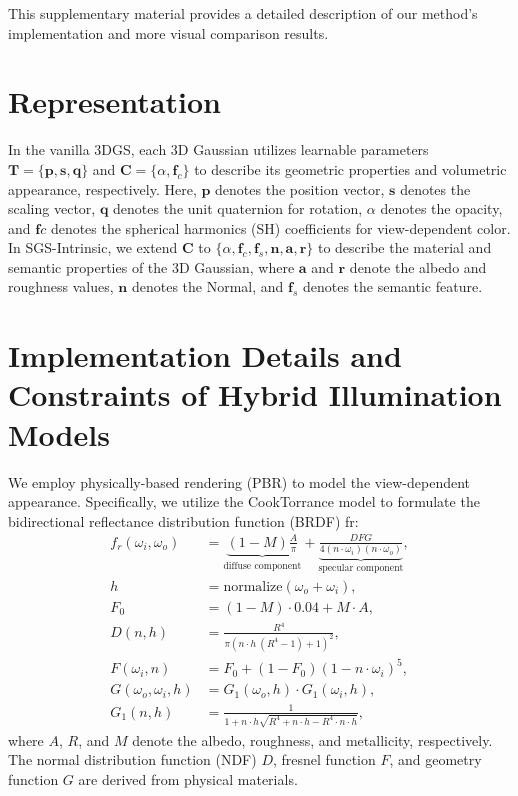 \setcounter{section}{0}

\maketitlesupplementary
This supplementary material provides a detailed description of our method's implementation and more 
visual comparison results.

\section{Representation}
In the vanilla 3DGS, each 3D Gaussian utilizes learnable parameters $\bm{T} = \{\bm{p}, \bm{s}, \bm{q} \}$ and $\bm{C} = \{\alpha, \bm{f}_{c}\}$ to describe its geometric properties and volumetric appearance, respectively.
Here, $\bm{p}$ denotes the position vector, $\bm{s}$ denotes the scaling vector, $\bm{q}$ denotes the unit quaternion for rotation, $\alpha$ denotes the opacity, and $\bm{f}{c}$ denotes the spherical harmonics (SH) coefficients for view-dependent color.
In SGS-Intrinsic, we extend $\bm{C}$ to $\{\alpha, \bm{f}_{c}, \bm{f}_{s}, \bm{n}, \bm{a}, \bm{r}\}$ to describe the material and semantic properties of the 3D Gaussian, where $\bm{a}$ and $\bm{r}$ denote the albedo and roughness values, $\bm{n}$ denotes the Normal, and $\bm{f}_{s}$ denotes the semantic feature.



\section{Implementation Details and Constraints of Hybrid Illumination Models}
We employ physically-based rendering (PBR) to model the view-dependent appearance. Specifically, we utilize the CookTorrance model to formulate the bidirectional reflectance distribution function (BRDF) fr:
\begin{equation}
\label{eq:brdf:supp}
\begin{aligned}
f_r(\omega_i, \omega_o) &= 
\underbrace{
(1 - M) \frac{A}{\pi}
}_{\text{diffuse component}} +
\underbrace{
\frac{DFG}{4(n \cdot \omega_i)(n \cdot \omega_o)}
}_{\text{specular component}}, \\
h &= \text{normalize}(\omega_o + \omega_i),\\
F_0 &= (1 - M) \cdot 0.04 + M \cdot A, \\
D(n, h) &= \frac{R^4}{\pi \left(
n \cdot h \ (R^4 - 1) + 1
\right)^2},\\
F(\omega_i, n) &= F_0 + (1 - F_0) \left(
1 - n \cdot \omega_i
\right)^5,\\
G(\omega_o, \omega_i, h) &= G_1(\omega_o, h) \cdot G_1(\omega_i, h),\\
G_1(n, h) &= \frac{1}{1 + n \cdot h \sqrt{R^4 + n \cdot h - R^4 \cdot n \cdot h}},
\end{aligned}
\end{equation}
where $A$, $R$, and $M$ denote the albedo, roughness, and metallicity, respectively. The normal distribution function (NDF) $D$, fresnel function $F$, and geometry function $G$ are derived from physical materials.



